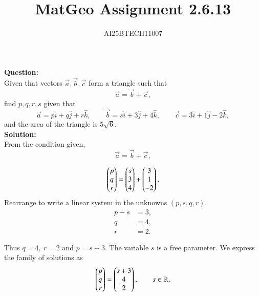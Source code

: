 \documentclass[journal]{IEEEtran}
\begin{document}

\vspace{3cm}

\title{MatGeo Assignment 2.6.13}
\author{AI25BTECH11007}
 \maketitle
{\let\newpage\relax\maketitle}

\renewcommand{\thefigure}{\theenumi}
\renewcommand{\thetable}{\theenumi}
\setlength{\intextsep}{10pt} %


\renewcommand{\thetable}{\theenumi}
\textbf{Question:}\\
Given that vectors $\vec{a},\vec{b},\vec{c}$ form a triangle such that
\[
\vec{a}=\vec{b}+\vec{c},
\]
find $p,q,r,s$ given that
\[
\vec{a}=p\hat{i}+q\hat{j}+r\hat{k},\qquad
\vec{b}=s\hat{i}+3\hat{j}+4\hat{k},\qquad
\vec{c}=3\hat{i}+1\hat{j}-2\hat{k},
\]
and the area of the triangle is $5\sqrt{6}$.\\


\noindent
\textbf{Solution:}\\
From the condition given, 
\[
\vec{a}=\vec{b}+\vec{c},
\]

\begin{equation}
\begin{pmatrix}p\\q\\r\end{pmatrix} = \begin{pmatrix}s\\3\\4\end{pmatrix} + \begin{pmatrix}3\\1\\-2\end{pmatrix}.
\end{equation}
Rearrange to write a linear system in the unknowns $(p,s,q,r)$.
\begin{align}
p - s &= 3,\\
q       &= 4,\\
r       &= 2. 
\end{align}

Thus $q=4,\ r=2$ and $p=s+3$. The variable $s$ is a free parameter. We express the family of solutions as
\begin{equation}\label{eq:param_solution}
\begin{pmatrix}p\\q\\r\end{pmatrix} = \begin{pmatrix}s+3\\4\\2\end{pmatrix},\qquad s\in\mathbb{R}.
\end{equation}
\end{document}
